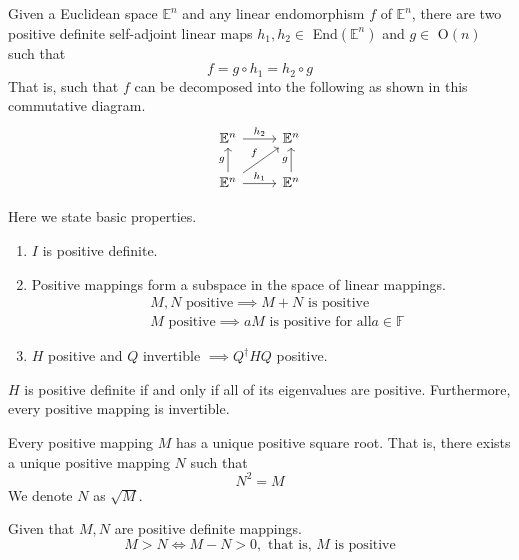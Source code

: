   \begin{theorem}
  Given a Euclidean space $\mathbb{E}^n$ and any linear endomorphism $f$ of $\mathbb{E}^n$, there are two positive definite self-adjoint linear maps $h_1, h_2 \in$ End$(\mathbb{E}^n)$ and $g \in$ O$(n)$ such that
  \[f = g \circ h_1 = h_2 \circ g\]
  That is, such that $f$ can be decomposed into the following as shown in this commutative diagram. 
  \[\begin{tikzcd}
  \mathbb{E}^n \arrow{r}{h_2} & \mathbb{E}^n \\
  \mathbb{E}^n \arrow{u}{g} \arrow{ur}{f} \arrow{r}{h_1} & \mathbb{E}^n \arrow{u}{g}
  \end{tikzcd}\]
  \end{theorem}

  \begin{theorem} Here we state basic properties. 
  \begin{enumerate}
      \item $I$ is positive definite. 
      \item Positive mappings form a subspace in the space of linear mappings. 
  \begin{align*}
      &M, N \text{ positive} \implies M + N \text{ is positive} \\
      &M \text{ positive} \implies a M \text{ is positive for all} a \in \mathbb{F}
  \end{align*}
      \item $H$ positive and $Q$ invertible $\implies Q^\dagger H Q$ positive. 
  \end{enumerate}
  \end{theorem}

  \begin{theorem}
  $H$ is positive definite if and only if all of its eigenvalues are positive. Furthermore, every positive mapping is invertible.
  \end{theorem}

  \begin{theorem}
  Every positive mapping $M$ has a unique positive square root. That is, there exists a unique positive mapping $N$ such that
  \[ N^2 = M \]
  We denote $N$ as $\sqrt{M}$. 
  \end{theorem}

  \begin{definition}
  Given that $M, N$ are positive definite mappings. 
  \[M > N \iff M - N > 0, \text{ that is, $M$ is positive}\]
  \end{definition}

